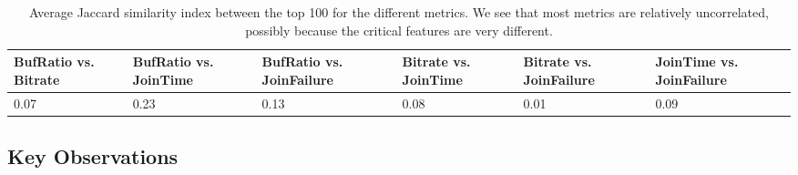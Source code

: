  



\begin{table}[t]
\begin{center}
\begin{small}
\begin{tabular}{p{2cm}|p{2cm}|p{2cm}|p{2cm}|p{2cm}|p{2cm}}
	BufRatio vs. Bitrate & BufRatio vs. JoinTime & BufRatio vs. JoinFailure & Bitrate vs. JoinTime & Bitrate vs. JoinFailure & JoinTime vs. JoinFailure\\ \hline 
0.07 & 0.23 & 0.13 & 0.08 & 0.01 & 0.09 \\
\end{tabular}
\end{small}
\end{center}
\caption{Average Jaccard similarity index between the top 
100 \criticalclusters for the different metrics. 
 We see that most metrics are relatively uncorrelated, possibly because the 
 critical features are very different.}
\end{table}




\subsection{Key Observations}
\label{subsec:measurement:video:findings}

